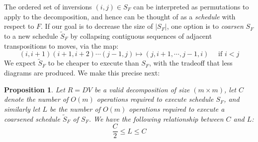 \documentclass{article} %
\newtheorem{proposition}{Proposition}
\begin{document}
The ordered set of inversions $(i,j) \in S_F$ can be interpreted as permutations to apply to the decomposition, and hence 
can be thought of as a \emph{schedule} with respect to $F$. 
If our goal is to decrease the size of $\lvert S_F \rvert$, one option is to \emph{coarsen} $S_F$ to a new schedule $\widetilde{S}_F$ by collapsing contiguous sequences of adjacent transpositions to moves, via the map:
\begin{equation}\label{eq:tr_to_mv}
	 (i, i+1)(i+1, i+2)\cdots(j-1, j) \mapsto (j, i+1, \cdots, j-1, i)  \quad \text{ if } i < j
\end{equation}
We expect $\widetilde{S}_F$ to be cheaper to execute than $S_F$, with the tradeoff  that less diagrams are produced.
We make this precise next:
\begin{proposition}\label{prop:factor2}
	Let $R = D V$ be a valid decomposition of size $(m \times m)$, let $C$ denote the number of $O(m)$ operations required to execute schedule $S_F$, and similarly let $L$ be the number of $O(m)$ operations required to execute a coarsened schedule $\widetilde{S}_F$ of $S_F$. We have the following relationship between $C$ and $L$:
	$$ \frac{C}{2} \leq L \leq C$$ 
\end{proposition}
\end{document}

